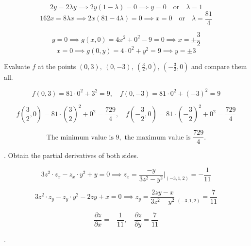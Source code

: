 \documentclass{article}
\begin{document}
\hfill

\[2y=2\lambda y\implies 2y(1-\lambda)=0\implies y=0\quad\text{or}\quad\lambda=1\]
\[162x=8\lambda x\implies 2x(81-4\lambda)=0\implies x=0\quad\text{or}\quad\lambda=\frac{81}4\]

\[y=0\implies g(x,0)=4x^2+0^2-9=0\implies x=\pm\frac32\]
\[x=0\implies g(0,y)=4\cdot0^2+y^2=9\implies y=\pm3\]

\hfill

\noindent Evaluate $f$ at the points $\displaystyle(0,3),\:(0,-3),\:\left(\frac32,0\right),\:\left(-\frac32,0\right)$ and compare them all.

\[f\left(0,3\right)=81\cdot0^2+3^2=9,\quad f\left(0,-3\right)=81\cdot0^2+(-3)^2=9\]

\[f\left(\frac32,0\right)=81\cdot\left(\frac32\right)^2+0^2=\frac{729}4,\quad f\left(-\frac32,0\right)=81\cdot\left(-\frac32\right)^2+0^2=\frac{729}4\]

\[\boxed{\text{The minimum value is }9,\text{ the maximum value is }\frac{729}4.}\]

\hfill

. Obtain the partial derivatives of both sides.

\[3z^2\cdot z_x-z_x\cdot y^2+y=0\implies z_x=\frac{-y}{3z^2-y^2}\bigg|_{(-3,1,2)}=-\frac1{11}\]

\[3z^2\cdot z_y-z_y\cdot y^2-2zy+x=0\implies z_y=\frac{2zy-x}{3z^2-y^2}\bigg|_{(-3,1,2)}=\frac7{11}\]

\[\boxed{\frac{\partial z}{\partial x}=-\frac1{11},\quad\frac{\partial z}{\partial y}=\frac7{11}}\]

\hfill

.

\hfill
\end{document}
